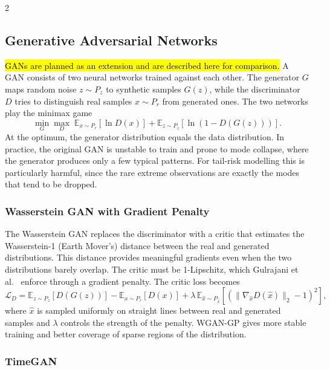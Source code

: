 \documentclass[12pt]{spieman}  %
\newcommand{\new}[1]{\hl{#1}}
\begin{document}
\begin{spacing}{2}
\subsection{Generative Adversarial Networks}

\new{GANs are planned as an extension and are described here for comparison.} A GAN \cite{Goodfellow14} consists of two neural networks trained against each other. The generator $G$ maps random noise $z \sim P_z$ to synthetic samples $G(z)$, while the discriminator $D$ tries to distinguish real samples $x \sim P_r$ from generated ones. The two networks play the minimax game
\begin{equation}
\min_G \max_D \; \mathbb{E}_{x\sim P_r}[\ln D(x)] + \mathbb{E}_{z\sim P_z}[\ln(1 - D(G(z)))].
\end{equation}
At the optimum, the generator distribution equals the data distribution. In practice, the original GAN is unstable to train and prone to mode collapse, where the generator produces only a few typical patterns. For tail-risk modelling this is particularly harmful, since the rare extreme observations are exactly the modes that tend to be dropped.

\subsubsection{Wasserstein GAN with Gradient Penalty}

The Wasserstein GAN \cite{Arjovsky17} replaces the discriminator with a critic that estimates the Wasserstein-1 (Earth Mover's) distance between the real and generated distributions. This distance provides meaningful gradients even when the two distributions barely overlap. The critic must be 1-Lipschitz, which Gulrajani et al.\ \cite{Gulrajani17} enforce through a gradient penalty. The critic loss becomes
\begin{equation}
\mathcal{L}_D = \mathbb{E}_{z\sim P_z}[D(G(z))] - \mathbb{E}_{x\sim P_r}[D(x)] + \lambda\, \mathbb{E}_{\hat{x}\sim P_{\hat{x}}}\left[\left(\lVert \nabla_{\hat{x}} D(\hat{x}) \rVert_2 - 1\right)^2\right],
\end{equation}
where $\hat{x}$ is sampled uniformly on straight lines between real and generated samples and $\lambda$ controls the strength of the penalty. WGAN-GP gives more stable training and better coverage of sparse regions of the distribution.

\subsubsection{TimeGAN}


\end{spacing}
\end{document}
